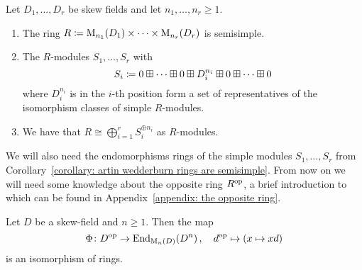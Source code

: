 \begin{corollary}
  \label{corollary: artin wedderburn rings are semisimple}
  Let $D_1, \dotsc, D_r$ be skew fields and let $n_1, \dotsc, n_r \geq 1$.
  \begin{enumerate}
    \item
      The ring $R \coloneqq  \operatorname{M}_{n_1}(D_1) \times \dotsb \times  \operatorname{M}_{n_r}(D_r)$ is semisimple.
    \item
      The $R$-modules $S_1, \dotsc, S_r$ with
      \[
                  S_i
        \coloneqq  0 \boxplus \dotsb \boxplus 0 \boxplus D_i^{n_i} \boxplus 0 \boxplus \dotsb \boxplus 0
      \]
      where $D_i^{n_i}$ is in the $i$-th position form a set of representatives of the isomorphism classes of simple $R$-modules.
    \item
      We have that $R \cong \bigoplus_{i=1}^r S_i^{\oplus n_i}$ as $R$-modules.
  \end{enumerate}
\end{corollary}


\begin{fluff}
  We will also need the endomorphisms rings of the simple modules $S_1, \dotsc, S_r$ from Corollary~\ref{corollary: artin wedderburn rings are semisimple}.
  From now on we will need some knowledge about the opposite ring $R^{\operatorname{op}}$, a brief introduction to which can be found in Appendix~\ref{appendix: the opposite ring}.
\end{fluff}


\begin{lemma}
  \label{lemma: matrix vector space correspondence for skew fields}
  Let $D$ be a skew-field and $n \geq 1$.
  Then the map
  \[
            \Phi 
    \colon  D^{\operatorname{op}}
    \to     \operatorname{End}_{\operatorname{M}_n(D)}(D^n) \,,
    \quad   d^{\operatorname{op}}
    \mapsto (x \mapsto xd)
  \]
  is an isomorphism of rings.
\end{lemma}


